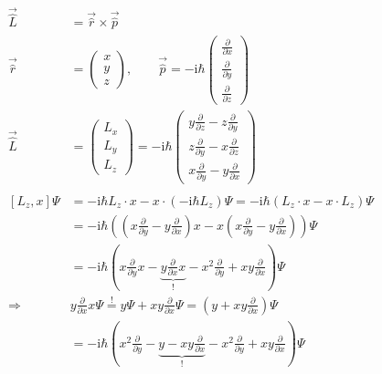     \begin{align*}
        \vec{\hat{L}} &= \vec{\hat{r}} \times \vec{\hat{p}}\\
        \vec{\hat{r}} &= 
        \begin{pmatrix}
            x\\
            y\\
            z
        \end{pmatrix},
        \qquad \vec{\hat{p}} = -\text{i}\hbar
        \begin{pmatrix}
            \frac{\partial}{\partial x}\\
            \frac{\partial}{\partial y}\\
            \frac{\partial}{\partial z}
        \end{pmatrix}\\
        \vec{\hat{L}} &= 
        \begin{pmatrix}
            L_x\\
            L_y\\
            L_z
        \end{pmatrix}
        = 
        -\text{i}\hbar
        \begin{pmatrix}
            y\frac{\partial}{\partial z} - z\frac{\partial}{\partial y}\\
            z\frac{\partial}{\partial y} - x\frac{\partial}{\partial z}\\
            x\frac{\partial}{\partial y} - y\frac{\partial}{\partial x}
        \end{pmatrix}\\
        \\
        \left[ L_z,x \right]\Psi &= -\text{i}\hbar L_z\cdot x - x \cdot \left( -\text{i}\hbar L_z \right)\Psi = -\text{i}\hbar \left( L_z\cdot x - x \cdot L_z \right)\Psi\\
        &= -\text{i}\hbar \left( \left( x\frac{\partial}{\partial y} - y\frac{\partial}{\partial x} \right)x - x \left( x\frac{\partial}{\partial y} - y\frac{\partial}{\partial x} \right) \right)\Psi\\
        &= -\text{i}\hbar \left( x\frac{\partial}{\partial y}x - \underbrace{y\frac{\partial}{\partial x}x}_{!} - x^2\frac{\partial}{\partial y} + xy\frac{\partial}{\partial x} \right)\Psi\\
        \Rightarrow&y\frac{\partial}{\partial x}x \Psi \stackrel{!}{=} y\Psi + xy\frac{\partial}{\partial x}\Psi = \left( y + xy\frac{\partial}{\partial x} \right) \Psi\\
        &= -\text{i}\hbar \left( x^2\frac{\partial}{\partial y} - \underbrace{y - xy\frac{\partial}{\partial x}}_{!} - x^2\frac{\partial}{\partial y} + xy\frac{\partial}{\partial x} \right)\Psi\\

\end{align*}
